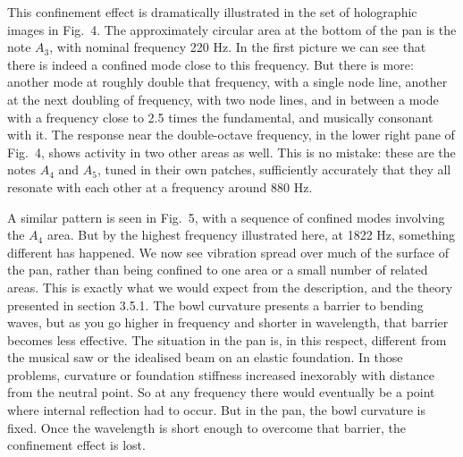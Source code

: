   This confinement effect is dramatically illustrated in the set of holographic 
  images in Fig.\ 4. The approximately circular area at the bottom of the pan 
  is the note $A_3$, with nominal frequency 220 Hz. In the first picture we can 
  see that there is indeed a confined mode close to this frequency. But there 
  is more: another mode at roughly double that frequency, with a single node 
  line, another at the next doubling of frequency, with two node lines, and in 
  between a mode with a frequency close to 2.5 times the fundamental, and 
  musically consonant with it. The response near the double-octave frequency, 
  in the lower right pane of Fig.\ 4, shows activity in two other areas as 
  well. This is no mistake: these are the notes $A_4$ and $A_5$, tuned in their 
  own patches, sufficiently accurately that they all resonate with each other 
  at a frequency around 880 Hz. 





  A similar pattern is seen in Fig.\ 5, with a sequence of confined modes 
  involving the $A_4$ area. But by the highest frequency illustrated here, at 
  1822 Hz, something different has happened. We now see vibration spread over 
  much of the surface of the pan, rather than being confined to one area or a 
  small number of related areas. This is exactly what we would expect from the 
  description, and the theory presented in section 3.5.1. The bowl curvature 
  presents a barrier to bending waves, but as you go higher in frequency and 
  shorter in wavelength, that barrier becomes less effective. The situation in 
  the pan is, in this respect, different from the musical saw or the idealised 
  beam on an elastic foundation. In those problems, curvature or foundation 
  stiffness increased inexorably with distance from the neutral point. So at 
  any frequency there would eventually be a point where internal reflection had 
  to occur. But in the pan, the bowl curvature is fixed. Once the wavelength is 
  short enough to overcome that barrier, the confinement effect is lost. 



